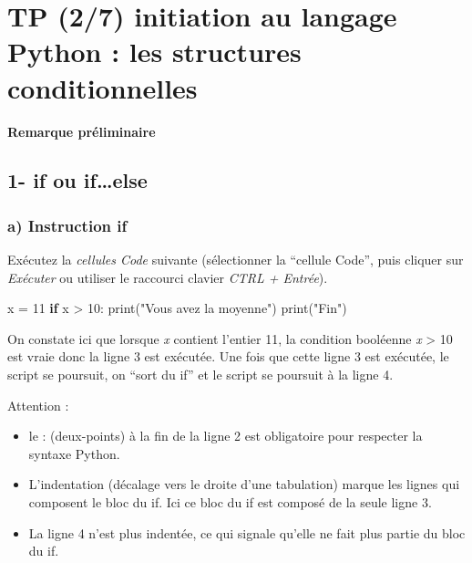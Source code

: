 \documentclass[
  paper=a4,
  ,captions=tableheading
]{scrartcl}
\author{}
\date{}
\title{}
\author{}
\date{}
\newenvironment{Shaded}{}{}
\newcommand{\BuiltInTok}[1]{\textcolor[rgb]{0.00,0.50,0.00}{#1}}
\newcommand{\ControlFlowTok}[1]{\textcolor[rgb]{0.00,0.44,0.13}{\textbf{#1}}}
\newcommand{\DecValTok}[1]{\textcolor[rgb]{0.25,0.63,0.44}{#1}}
\newcommand{\NormalTok}[1]{#1}
\newcommand{\OperatorTok}[1]{\textcolor[rgb]{0.40,0.40,0.40}{#1}}
\newcommand{\StringTok}[1]{\textcolor[rgb]{0.25,0.44,0.63}{#1}}
\begin{document}




\hypertarget{tp-27-initiation-au-langage-python--les-structures-conditionnelles}{%
\section{TP (2/7) initiation au langage Python : les structures
conditionnelles}\label{tp-27-initiation-au-langage-python--les-structures-conditionnelles}}

\textbf{Remarque préliminaire}

\hypertarget{1--if-ou-ifelse}{%
\subsection{1- if ou if\ldots else}\label{1--if-ou-ifelse}}

\hypertarget{a-instruction-if}{%
\subsubsection{a) Instruction if}\label{a-instruction-if}}

Exécutez la \emph{cellules Code} suivante (sélectionner la ``cellule
Code'', puis cliquer sur \emph{Exécuter} ou utiliser le raccourci
clavier \emph{CTRL + Entrée}).

\begin{Shaded}
\begin{Highlighting}[]
\NormalTok{x }\OperatorTok{=} \DecValTok{11}
\ControlFlowTok{if}\NormalTok{ x }\OperatorTok{\textgreater{}} \DecValTok{10}\NormalTok{:}
    \BuiltInTok{print}\NormalTok{(}\StringTok{"Vous avez la moyenne"}\NormalTok{)}
\BuiltInTok{print}\NormalTok{(}\StringTok{"Fin"}\NormalTok{)}
\end{Highlighting}
\end{Shaded}

On constate ici que lorsque \emph{x} contient l'entier 11, la condition
booléenne \emph{x} \textgreater{} 10 est vraie donc la ligne 3 est
exécutée. Une fois que cette ligne 3 est exécutée, le script se
poursuit, on ``sort du if'' et le script se poursuit à la ligne 4.

Attention :

\begin{itemize}
\item
  le : (deux-points) à la fin de la ligne 2 est obligatoire pour
  respecter la syntaxe Python.
\item
  L'indentation (décalage vers le droite d'une tabulation) marque les
  lignes qui composent le bloc du if. Ici ce bloc du if est composé de
  la seule ligne 3.
\item
  La ligne 4 n'est plus indentée, ce qui signale qu'elle ne fait plus
  partie du bloc du if.
\end{itemize}
\end{document}
